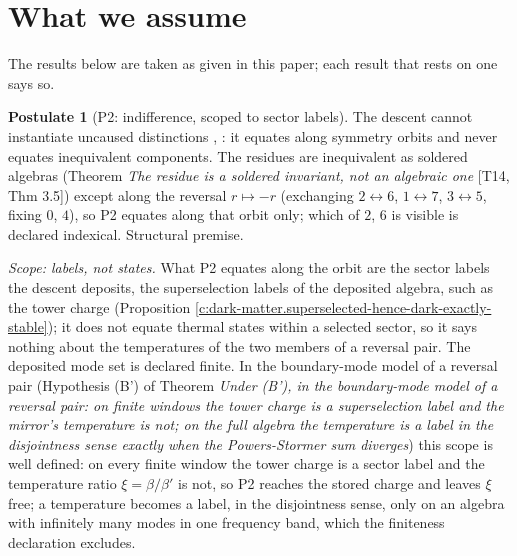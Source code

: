 \documentclass[11pt]{article}
\theoremstyle{definition}
\newtheorem{postulate}[theorem]{Postulate}
\theoremstyle{plain}
\begin{document}
\section*{What we assume}
The results below are taken as given in this paper; each result that rests on one says so.
\begin{postulate}[P2: indifference, scoped to sector labels]\label{c:dark-matter.p2-indifference}
The descent cannot instantiate uncaused distinctions \cite[Principle~5.4]{ButlerT8}, \cite[\S2]{ButlerT13}: it equates along symmetry orbits and never equates inequivalent components. The residues are inequivalent as soldered algebras (Theorem \emph{The residue is a soldered invariant, not an algebraic one} [T14, Thm 3.5]) except along the reversal $r \mapsto -r$ (exchanging $2 \leftrightarrow 6$, $1 \leftrightarrow 7$, $3 \leftrightarrow 5$, fixing $0$, $4$), so P2 equates along that orbit only; which of $2$, $6$ is visible is declared indexical. Structural premise.

\emph{Scope: labels, not states.} What P2 equates along the orbit are the sector labels the descent deposits, the superselection labels of the deposited algebra, such as the tower charge (Proposition \ref{c:dark-matter.superselected-hence-dark-exactly-stable}); it does not equate thermal states within a selected sector, so it says nothing about the temperatures of the two members of a reversal pair. The deposited mode set is declared finite. In the boundary-mode model of a reversal pair (Hypothesis (B') of Theorem \emph{Under (B'), in the boundary-mode model of a reversal pair: on finite windows the tower charge is a superselection label and the mirror's temperature is not; on the full algebra the temperature is a label in the disjointness sense exactly when the Powers-Stormer sum diverges}) this scope is well defined: on every finite window the tower charge is a sector label and the temperature ratio $\xi = \beta/\beta'$ is not, so P2 reaches the stored charge and leaves $\xi$ free; a temperature becomes a label, in the disjointness sense, only on an algebra with infinitely many modes in one frequency band, which the finiteness declaration excludes.
\end{postulate}
\end{document}
